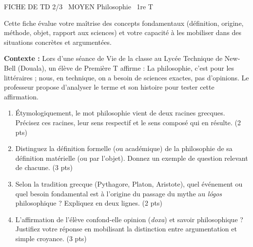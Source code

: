 \documentclass[11pt]{article}
\begin{document}
\begin{tcolorbox}[enhanced,colback=popink,colframe=popink,arc=10pt,boxrule=0pt,left=12pt,right=12pt,top=9pt,bottom=9pt]
{\color{white}\popxbold\small FICHE DE TD 2/3 \textbullet\ MOYEN \hfill Philosophie \textbullet\ 1re T\par}
\end{tcolorbox}
\vspace{4pt}
Cette fiche évalue votre maîtrise des concepts fondamentaux (définition, origine, méthode, objet, rapport aux sciences) et votre capacité à les mobiliser dans des situations concrètes et argumentées.

\begin{exercice}
\textbf{Contexte :} Lors d'une séance de \og{}Vie de la classe\fg{} au Lycée Technique de New-Bell (Douala), un élève de Première T affirme : \og{}La philosophie, c'est pour les littéraires ; nous, en technique, on a besoin de sciences exactes, pas d'opinions.\fg{} Le professeur propose d'analyser le terme et son histoire pour tester cette affirmation.

\begin{enumerate}
    \item Étymologiquement, le mot \og{}philosophie\fg{} vient de deux racines grecques. Précisez ces racines, leur sens respectif et le sens composé qui en résulte. (2 pts)
    \item Distinguez la définition \og{}formelle\fg{} (ou académique) de la philosophie de sa définition \og{}matérielle\fg{} (ou par l'objet). Donnez un exemple de question relevant de chacune. (3 pts)
    \item Selon la tradition grecque (Pythagore, Platon, Aristote), quel événement ou quel besoin fondamental est à l'origine du passage du mythe au \textit{lógos} philosophique ? Expliquez en deux lignes. (2 pts)
    \item L'affirmation de l'élève confond-elle \og{}opinion\fg{} (\textit{doxa}) et \og{}savoir philosophique\fg{} ? Justifiez votre réponse en mobilisant la distinction entre argumentation et simple croyance. (3 pts)
\end{enumerate}
\end{exercice}
\end{document}
